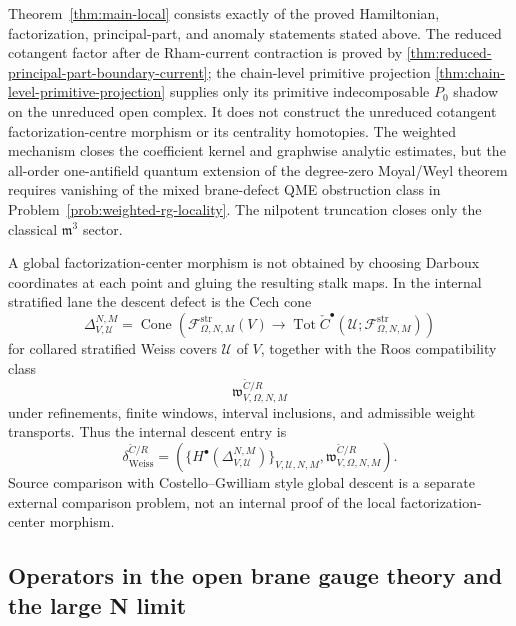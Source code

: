 \documentclass[11pt]{memoir}
\begin{document}


\begin{rmk}
  Theorem~\ref{thm:main-local} consists exactly of the proved Hamiltonian,
  factorization, principal-part, and anomaly statements stated above.
  The reduced cotangent factor after de Rham-current contraction is proved by
  \ref{thm:reduced-principal-part-boundary-current}; the chain-level
  primitive projection
  \ref{thm:chain-level-primitive-projection} supplies only its primitive
  indecomposable $P_0$ shadow on the unreduced open complex. It does not
  construct the unreduced cotangent factorization-centre morphism or its
  centrality homotopies. The weighted mechanism closes the coefficient kernel
  and graphwise analytic estimates, but the all-order one-antifield quantum
  extension of the degree-zero Moyal/Weyl theorem requires vanishing of the
  mixed brane-defect QME obstruction class in
  Problem~\ref{prob:weighted-rg-locality}. The
  nilpotent truncation closes only the classical $\mathfrak m^3$ sector.
\end{rmk}

\begin{rmk}\label{rmk:weiss-ran-descent-obstruction}
  A global factorization-center morphism is not obtained by choosing Darboux
  coordinates at each point and gluing the resulting stalk maps.  In the
  internal stratified lane the descent defect is the Cech cone
  \[
    \Delta^{N,M}_{V,\mathcal U}
    =
    \operatorname{Cone}\!\left(
      \mathcal F^{\mathrm{str}}_{\Omega,N,M}(V)
      \to
      \operatorname{Tot}\check C^\bullet
      (\mathcal U;\mathcal F^{\mathrm{str}}_{\Omega,N,M})
    \right)
  \]
  for collared stratified Weiss covers \(\mathcal U\) of \(V\), together
  with the Roos compatibility class
  \[
    \mathfrak w^{\check C/R}_{V,\Omega,N,M}
  \]
  under refinements, finite windows, interval inclusions, and admissible
  weight transports.  Thus the internal descent entry is
  \[
    \delta_{\mathrm{Weiss}}^{\check C/R}
    =
    \left(
      \{H^\bullet(\Delta^{N,M}_{V,\mathcal U})\}_{V,\mathcal U,N,M},
      \mathfrak w^{\check C/R}_{V,\Omega,N,M}
    \right).
  \]
  Source comparison with Costello--Gwilliam style global descent is a
  separate external comparison problem, not an internal proof of the
  local factorization-center morphism.
\end{rmk}

\subsection{Operators in the open brane gauge theory and the large N limit}
\end{document}
